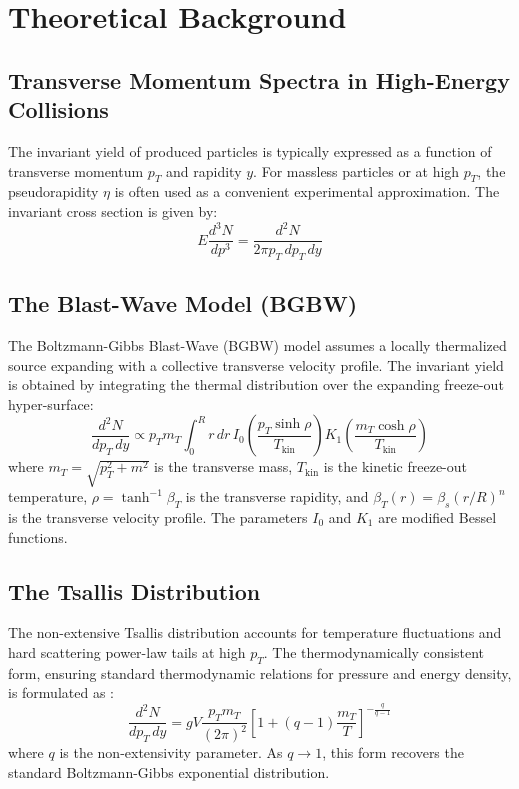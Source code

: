 \chapter{Theoretical Background}
\label{ch:theoretical_background}

\section{Transverse Momentum Spectra in High-Energy Collisions}
The invariant yield of produced particles is typically expressed as a function of transverse momentum $p_T$ and rapidity $y$. For massless particles or at high $p_T$, the pseudorapidity $\eta$ is often used as a convenient experimental approximation. The invariant cross section is given by:
\begin{equation}
E \frac{d^3N}{dp^3} = \frac{d^2N}{2\pi p_T \, dp_T \, dy}
\end{equation}

\section{The Blast-Wave Model (BGBW)}
The Boltzmann-Gibbs Blast-Wave (BGBW) model assumes a locally thermalized source expanding with a collective transverse velocity profile. The invariant yield is obtained by integrating the thermal distribution over the expanding freeze-out hyper-surface:
\begin{equation}
\frac{d^2N}{dp_T \, dy} \propto p_T m_T \int_0^R r \, dr \, I_0\left(\frac{p_T \sinh\rho}{T_{\text{kin}}}\right) K_1\left(\frac{m_T \cosh\rho}{T_{\text{kin}}}\right)
\end{equation}
where $m_T = \sqrt{p_T^2 + m^2}$ is the transverse mass, $T_{\text{kin}}$ is the kinetic freeze-out temperature, $\rho = \tanh^{-1}\beta_T$ is the transverse rapidity, and $\beta_T(r) = \beta_s (r/R)^n$ is the transverse velocity profile. The parameters $I_0$ and $K_1$ are modified Bessel functions.

\section{The Tsallis Distribution}
The non-extensive Tsallis distribution accounts for temperature fluctuations and hard scattering power-law tails at high $p_T$. The thermodynamically consistent form, ensuring standard thermodynamic relations for pressure and energy density, is formulated as \citep{Cleymans2012}:
\begin{equation}
\frac{d^2N}{dp_T \, dy} = gV \frac{p_T m_T}{(2\pi)^2} \left[ 1 + (q-1)\frac{m_T}{T} \right]^{-\frac{q}{q-1}}
\end{equation}
where $q$ is the non-extensivity parameter. As $q \to 1$, this form recovers the standard Boltzmann-Gibbs exponential distribution.

